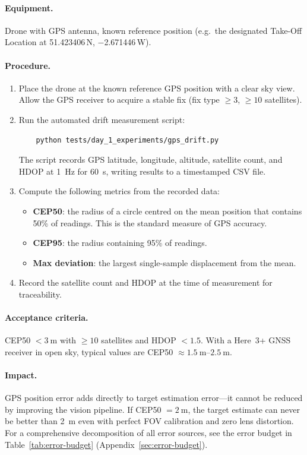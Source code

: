 \paragraph{Equipment.} Drone with GPS antenna, known reference position (e.g.\ the designated Take-Off Location at 51.423406\textdegree\,N, $-$2.671446\textdegree\,W).

\paragraph{Procedure.}
\begin{enumerate}
    \item Place the drone at the known reference GPS position with a clear sky view. Allow the GPS receiver to acquire a stable fix (fix type $\geq 3$, $\geq 10$ satellites).
    \item Run the automated drift measurement script:
    \begin{verbatim}
    python tests/day_1_experiments/gps_drift.py
    \end{verbatim}
    The script records GPS latitude, longitude, altitude, satellite count, and HDOP at \SI{1}{\hertz} for \SI{60}{\second}, writing results to a timestamped CSV file.
    \item Compute the following metrics from the recorded data:
    \begin{itemize}
        \item \textbf{CEP50}: the radius of a circle centred on the mean position that contains 50\% of readings. This is the standard measure of GPS accuracy.
        \item \textbf{CEP95}: the radius containing 95\% of readings.
        \item \textbf{Max deviation}: the largest single-sample displacement from the mean.
    \end{itemize}
    \item Record the satellite count and HDOP at the time of measurement for traceability.
\end{enumerate}

\paragraph{Acceptance criteria.} CEP50 $< \SI{3}{\metre}$ with $\geq 10$ satellites and HDOP $< 1.5$. With a Here~3+ GNSS receiver in open sky, typical values are CEP50 $\approx \SIrange{1.5}{2.5}{\metre}$.

\paragraph{Impact.} GPS position error adds directly to target estimation error---it cannot be reduced by improving the vision pipeline. If CEP50 $= \SI{2}{\metre}$, the target estimate can never be better than \SI{2}{\metre} even with perfect FOV calibration and zero lens distortion. For a comprehensive decomposition of all error sources, see the error budget in Table~\ref{tab:error-budget} (Appendix~\ref{sec:error-budget}).

